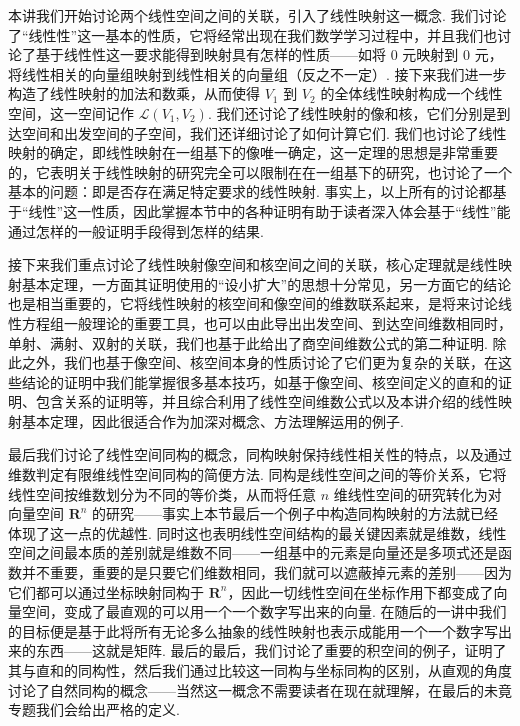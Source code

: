 \begin{summary}

    本讲我们开始讨论两个线性空间之间的关联，引入了线性映射这一概念. 我们讨论了``线性性''这一基本的性质，它将经常出现在我们数学学习过程中，并且我们也讨论了基于线性性这一要求能得到映射具有怎样的性质——如将 $0$ 元映射到 $0$ 元，将线性相关的向量组映射到线性相关的向量组（反之不一定）. 接下来我们进一步构造了线性映射的加法和数乘，从而使得 $V_1$ 到 $V_2$ 的全体线性映射构成一个线性空间，这一空间记作 $\mathcal{L}(V_1,V_2)$. 我们还讨论了线性映射的像和核，它们分别是到达空间和出发空间的子空间，我们还详细讨论了如何计算它们. 我们也讨论了线性映射的确定，即线性映射在一组基下的像唯一确定，这一定理的思想是非常重要的，它表明关于线性映射的研究完全可以限制在在一组基下的研究，也讨论了一个基本的问题：即是否存在满足特定要求的线性映射. 事实上，以上所有的讨论都基于``线性''这一性质，因此掌握本节中的各种证明有助于读者深入体会基于``线性''能通过怎样的一般证明手段得到怎样的结果.

    接下来我们重点讨论了线性映射像空间和核空间之间的关联，核心定理就是线性映射基本定理，一方面其证明使用的``设小扩大''的思想十分常见，另一方面它的结论也是相当重要的，它将线性映射的核空间和像空间的维数联系起来，是将来讨论线性方程组一般理论的重要工具，也可以由此导出出发空间、到达空间维数相同时，单射、满射、双射的关联，我们也基于此给出了商空间维数公式的第二种证明. 除此之外，我们也基于像空间、核空间本身的性质讨论了它们更为复杂的关联，在这些结论的证明中我们能掌握很多基本技巧，如基于像空间、核空间定义的直和的证明、包含关系的证明等，并且综合利用了线性空间维数公式以及本讲介绍的线性映射基本定理，因此很适合作为加深对概念、方法理解运用的例子.

    最后我们讨论了线性空间同构的概念，同构映射保持线性相关性的特点，以及通过维数判定有限维线性空间同构的简便方法. 同构是线性空间之间的等价关系，它将线性空间按维数划分为不同的等价类，从而将任意 $n$ 维线性空间的研究转化为对向量空间 $\mathbf{R}^n$ 的研究——事实上本节最后一个例子中构造同构映射的方法就已经体现了这一点的优越性. 同时这也表明线性空间结构的最关键因素就是维数，线性空间之间最本质的差别就是维数不同——一组基中的元素是向量还是多项式还是函数并不重要，重要的是只要它们维数相同，我们就可以遮蔽掉元素的差别——因为它们都可以通过坐标映射同构于 $\mathbf{R}^n$，因此一切线性空间在坐标作用下都变成了向量空间，变成了最直观的可以用一个一个数字写出来的向量. 在随后的一讲中我们的目标便是基于此将所有无论多么抽象的线性映射也表示成能用一个一个数字写出来的东西——这就是矩阵. 最后的最后，我们讨论了重要的积空间的例子，证明了其与直和的同构性，然后我们通过比较这一同构与坐标同构的区别，从直观的角度讨论了自然同构的概念——当然这一概念不需要读者在现在就理解，在最后的未竟专题我们会给出严格的定义.

\end{summary}

